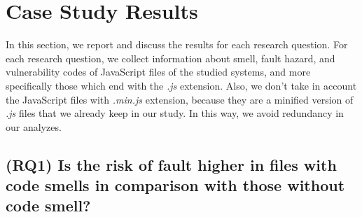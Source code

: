 \section{Case Study Results}\label{sec:case-study}
In this section, we report and discuss the results for each research question. {\color{blue}For each research question, we collect information about smell, fault hazard, and vulnerability codes of JavaScript files of the studied systems, and more specifically those which end with the \textsl{.js} extension. Also, we don't take in account the JavaScript files with \textsl{.min.js} extension, because they are a minified version of \textsl{.js} files that we already keep in our study. In this way, we avoid redundancy in our analyzes.}

\subsection*{(RQ1) Is the risk of fault higher in files with code smells in comparison with those without code smell?}



